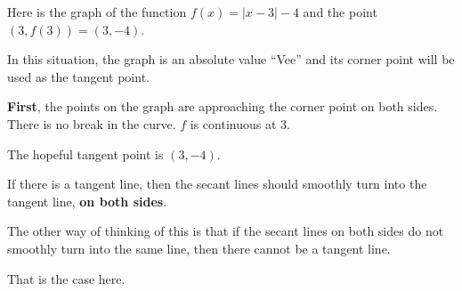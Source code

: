 \documentclass{ximera}
\begin{document}
Here is the graph of the function $f(x) = | x - 3 | - 4$ and the point $(3, f(3))= (3, -4)$. 

\begin{image}
\end{image}

In this situation, the graph is an absolute value ``Vee'' and its corner point will be used as the tangent point. 


\textbf{First}, the points on the graph are approaching the corner point on both sides.  There is no break in the curve. $f$ is continuous at $3$.


The hopeful tangent point is $(3, -4)$. 


If there is a tangent line, then the secant lines should smoothly turn into the tangent line, \textbf{on both sides}.  


The other way of thinking of this is that if the secant lines on both sides do not smoothly turn into the same line, then there cannot be a tangent line. 

That is the case here. 
\end{document}
